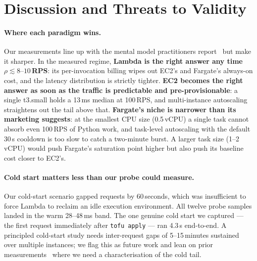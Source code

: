 \section{Discussion and Threats to Validity}
\label{sec:discussion}

\paragraph{Where each paradigm wins.} Our measurements line up with the
mental model practitioners report~\cite{eismann2021review} but make it
sharper. In the measured regime, \textbf{Lambda is the right answer
any time $\rho \lesssim 8\text{--}10$\,RPS}: its per-invocation billing wipes out
EC2's and Fargate's always-on cost, and the latency distribution is
strictly tighter. \textbf{EC2 becomes the right answer as soon as the
traffic is predictable and pre-provisionable}: a single t3.small holds a
13\,ms median at 100\,RPS, and multi-instance autoscaling straightens
out the tail above that. \textbf{Fargate's niche is narrower than its
marketing suggests}: at the smallest CPU size (0.5\,vCPU) a single task
cannot absorb even 100\,RPS of Python work, and task-level autoscaling
with the default 30\,s cooldown is too slow to catch a two-minute burst.
A larger task size (1--2\,vCPU) would push Fargate's saturation point
higher but also push its baseline cost closer to EC2's.

\paragraph{Cold start matters less than our probe could measure.}
Our cold-start scenario gapped requests by 60\,seconds, which was
insufficient to force Lambda to reclaim an idle execution environment.
All twelve probe samples landed in the warm 28--48\,ms band. The one
genuine cold start we captured --- the first request immediately after
\texttt{tofu apply} --- ran 4.3\,s end-to-end. A principled cold-start
study needs inter-request gaps of 5--15\,minutes sustained over
multiple instances; we flag this as future work and lean on prior
measurements~\cite{peeking-serverless, mcgrath-faas} where we need a
characterisation of the cold tail.

